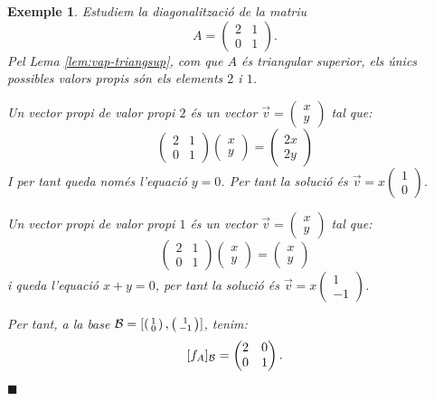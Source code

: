 \documentclass[
  11pt,
]{book}
\numberwithin{dummy}{section}
\theoremstyle{maincolornumbox}
\theoremstyle{blacknumex}
\newtheorem{exampleT}{Exemple}[chapter]
\theoremstyle{blacknumbox}
\theoremstyle{maincolornum}
\newenvironment{example}{\begin{exampleT}}{\hfill{\tiny\ensuremath{\blacksquare}}\end{exampleT}}
\begin{document}
\begin{example}
\protect\hypertarget{exm:mat2101}{}\label{exm:mat2101}Estudiem la diagonalització de la
matriu \[A=\begin{pmatrix}
2 &  1 \\ 0 & 1
\end{pmatrix}.\] Pel Lema
\ref{lem:vap-triangsup}, com que \(A\) és triangular superior, els
únics possibles valors propis són els elements \(2\) i \(1\).

Un vector propi de valor propi \(2\) és un vector
\(\vec v=\left(\begin{smallmatrix} x \\ y \end{smallmatrix}\right)\) tal
que: \[\begin{pmatrix}
2 &  1 \\ 0 & 1
\end{pmatrix}
\begin{pmatrix} x \\ y \end{pmatrix} =
\begin{pmatrix} 2x \\ 2y \end{pmatrix}\] I per tant queda només
l'equació \(y  = 0\). Per tant la solució és
\(\vec v= x\left(\begin{smallmatrix} 1 \\ 0 \end{smallmatrix}\right)\).

Un vector propi de valor propi \(1\) és un vector
\(\vec v=\left(\begin{smallmatrix} x \\ y \end{smallmatrix}\right)\) tal
que: \[\begin{pmatrix}
2 &  1 \\ 0 & 1
\end{pmatrix}
\begin{pmatrix} x \\ y \end{pmatrix} =
\begin{pmatrix} x \\ y \end{pmatrix}\] i queda l'equació \(x+y=0\), per
tant la solució és
\(\vec v=x\left(\begin{smallmatrix} 1 \\ -1 \end{smallmatrix}\right)\).

Per tant, a la base
\(\mathcal{B}=[\left(\begin{smallmatrix} 1 \\ 0 \end{smallmatrix}\right),\left(\begin{smallmatrix} 1 \\ -1 \end{smallmatrix}\right)]\),
tenim: \[[f_A]_{\mathcal{B}}=\begin{pmatrix}
2 & 0 \\ 0 & 1
\end{pmatrix}.\]
\end{example}
\end{document}
